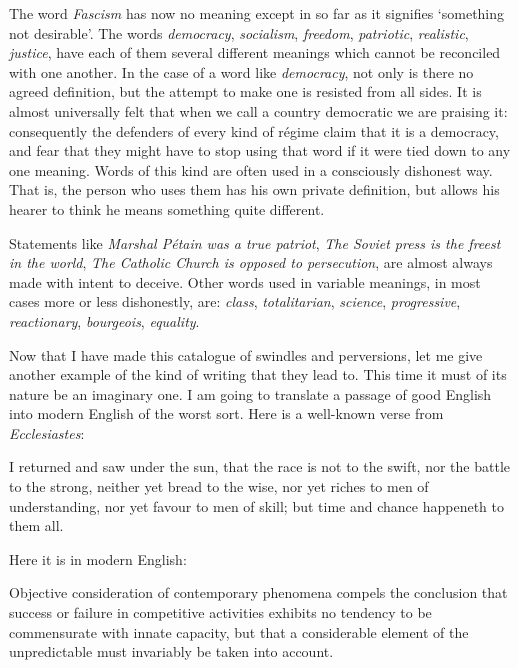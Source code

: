 The word \textit{Fascism }has now no meaning except in so far as it signifies ‘something not desirable’. The words \textit{democracy}, \textit{socialism}, \textit{freedom}, \textit{patriotic}, \textit{realistic}, \textit{justice}, have each of them several different meanings which cannot be reconciled with one another. In the case of a word like \textit{democracy}, not only is there no agreed definition, but the attempt to make one is resisted from all sides. It is almost universally felt that when we call a country democratic we are praising it: consequently the defenders of every kind of régime claim that it is a democracy, and fear that they might have to stop using that word if it were tied down to any one meaning. Words of this kind are often used in a consciously dishonest way. That is, the person who uses them has his own private definition, but allows his hearer to think he means something quite different.\par

Statements like \textit{Marshal Pétain was a true patriot}, \textit{The Soviet press is the freest in the world}, \textit{The Catholic Church is opposed to persecution}, are almost always made with intent to deceive. Other words used in variable meanings, in most cases more or less dishonestly, are: \textit{class}, \textit{totalitarian}, \textit{science}, \textit{progressive}, \textit{reactionary}, \textit{bourgeois}, \textit{equality}.\par

Now that I have made this catalogue of swindles and perversions, let me give another example of the kind of writing that they lead to. This time it must of its nature be an imaginary one. I am going to translate a passage of good English into modern English of the worst sort. Here is a well-known verse from \textit{Ecclesiastes}:\par

\begin{rquote}
I returned and saw under the sun, that the race is not to the swift, nor the battle to the strong, neither yet bread to the wise, nor yet riches to men of understanding, nor yet favour to men of skill; but time and chance happeneth to them all.
\end{rquote}

Here it is in modern English:\par

\begin{rquote}
Objective consideration of contemporary phenomena compels the conclusion that success or failure in competitive activities exhibits no tendency to be commensurate with innate capacity, but that a considerable element of the unpredictable must invariably be taken into account.
\end{rquote}

